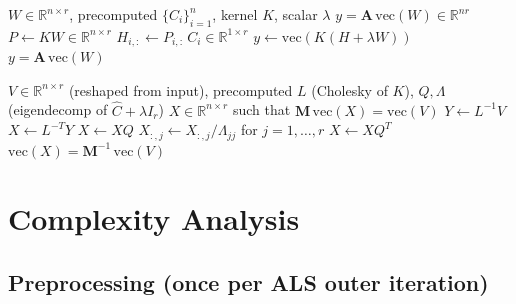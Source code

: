 \documentclass[12pt]{article}
\theoremstyle{definition}
\begin{document}
\begin{algorithm}[H]
\caption{Matrix-Vector Product: $\mathrm{vec}(W) \mapsto \mathbf{A}\,\mathrm{vec}(W)$}
\label{alg:matvec}
\begin{algorithmic}[1]
\Require $W \in \mathbb{R}^{n\times r}$, precomputed $\{C_i\}_{i=1}^n$, kernel $K$, scalar $\lambda$
\Ensure $y = \mathbf{A}\,\mathrm{vec}(W) \in \mathbb{R}^{nr}$
\State $P \leftarrow KW \in \mathbb{R}^{n\times r}$ 
    \State $H_{i,:} \leftarrow P_{i,:}\,C_i \in \mathbb{R}^{1\times r}$ 
\EndFor
\State $y \leftarrow \mathrm{vec}(K(H + \lambda W))$ 
\Ensure $y = \mathbf{A}\,\mathrm{vec}(W)$
\end{algorithmic}
\end{algorithm}

\begin{algorithm}[H]
\caption{Preconditioner Application: $\mathrm{vec}(V) \mapsto \mathbf{M}^{-1}\,\mathrm{vec}(V)$}
\label{alg:precond}
\begin{algorithmic}[1]
\Require $V \in \mathbb{R}^{n\times r}$ (reshaped from input), precomputed $L$ (Cholesky of $K$), $Q, \Lambda$ (eigendecomp of $\hat{C}+\lambda I_r$)
\Ensure $X \in \mathbb{R}^{n\times r}$ such that $\mathbf{M}\,\mathrm{vec}(X) = \mathrm{vec}(V)$
\State $Y \leftarrow L^{-1} V$ 
\State $X \leftarrow L^{-T} Y$ 
\State $X \leftarrow X Q$ 
\State $X_{:,j} \leftarrow X_{:,j} / \Lambda_{jj}$ for $j = 1,\dots,r$ 
\State $X \leftarrow X Q^T$ 
\Ensure $\mathrm{vec}(X) = \mathbf{M}^{-1}\,\mathrm{vec}(V)$
\end{algorithmic}
\end{algorithm}

\section{Complexity Analysis}\label{sec:complexity}

\subsection{Preprocessing (once per ALS outer iteration)}
\end{document}

